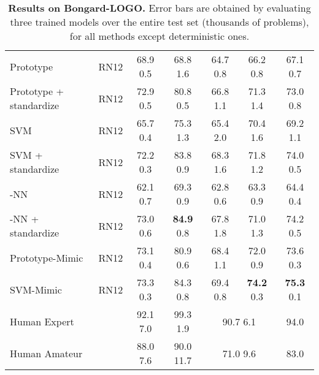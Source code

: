\begin{table*}
\begin{tabular}{lcccccc}
    \midrule
    Prototype & RN12 & 68.9  0.5 & 68.8  1.6 & 64.7  0.8 & 66.2  0.8 & 67.1  0.7 \\
    Prototype + standardize & RN12 & 72.9  0.5 & 80.8  0.5 & 66.8  1.1 & 71.3  1.4 & 73.0  0.8 \\
    SVM & RN12 & 65.7  0.4 & 75.3  1.3 & 65.4  2.0 & 70.4  1.6 & 69.2  1.1 \\
    SVM + standardize & RN12 & 72.2  0.3 & 83.8  0.9 & 68.3  1.6 & 71.8  1.2 & 74.0  0.5 \\
    -NN & RN12 & 62.1  0.7 & 69.3  0.9 & 62.8  0.6 & 63.3  0.9 & 64.4  0.4 \\
    -NN + standardize & RN12 & 73.0  0.6 & \textbf{84.9}  0.8 & 67.8  1.8 & 71.0  1.3 & 74.2  0.5 \\
    Prototype-Mimic & RN12 & 73.1  0.4 & 80.9  0.6 & 68.4  1.1 & 72.0  0.9 & 73.6  0.3\\
    SVM-Mimic & RN12 & 73.3  0.3  &  84.3  0.8 & 69.4  0.8  & \textbf{74.2}  0.3 & \textbf{75.3}  0.1 \\
    \midrule
    Human Expert~\cite{nie2021bongardlogo} & & 92.1  7.0 & 99.3  1.9 & \multicolumn{2}{c}{90.7  6.1}  &  94.0 \\
    Human Amateur~\cite{nie2021bongardlogo}&  & 88.0  7.6 & 90.0  11.7 & \multicolumn{2}{c}{71.0  9.6} &  83.0 \\
    \bottomrule
  \end{tabular}
    \caption{\textbf{Results on Bongard-LOGO.}
    Error bars are obtained by evaluating three trained models over the entire test set (thousands of problems), for all methods except deterministic ones.}
    \label{tab:logo}

\end{table*}

